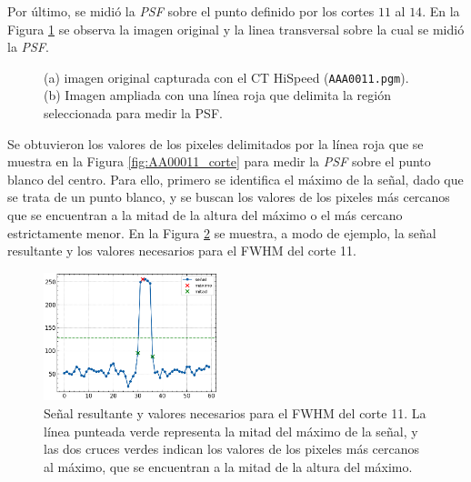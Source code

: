\documentclass[11pt, twocolumn]{article}
\begin{document}
Por último, se midió la \textit{PSF} sobre el punto definido por los cortes $11$ al $14$. En la Figura \ref{fig:figuras_ej_7_b} se observa la imagen original y la linea transversal sobre la cual se midió la \textit{PSF}. 

\begin{figure}[htbp]
  \centering
  \hfill
  \hfill
  \caption{(a) imagen original capturada con el CT HiSpeed (\texttt{AAA0011.pgm}). (b) Imagen ampliada con una línea roja que delimita la región seleccionada para medir la PSF.}
  \label{fig:figuras_ej_7_b}
\end{figure}

Se obtuvieron los valores de los pixeles delimitados por la línea roja que se muestra en la Figura \ref{fig:AA00011_corte} para medir la \textit{PSF} sobre el punto blanco del centro. Para ello, primero se identifica el máximo de la señal, dado que se trata de un punto blanco, y se buscan los valores de los pixeles más cercanos que se encuentran a la mitad de la altura del máximo o el más cercano estrictamente menor. En la Figura \ref{fig:PSF} se muestra, a modo de ejemplo, la señal resultante y los valores necesarios para el FWHM del corte 11.

\begin{figure}[htbp]
  \centering
  \includegraphics[width=0.45\textwidth]{images/ej_7/PSF.png}
  \caption{Señal resultante y valores necesarios para el FWHM del corte 11. La línea punteada verde representa la mitad del máximo de la señal, y las dos cruces verdes indican los valores de los pixeles más cercanos al máximo, que se encuentran a la mitad de la altura del máximo.}
  \label{fig:PSF}
\end{figure}
\end{document}
